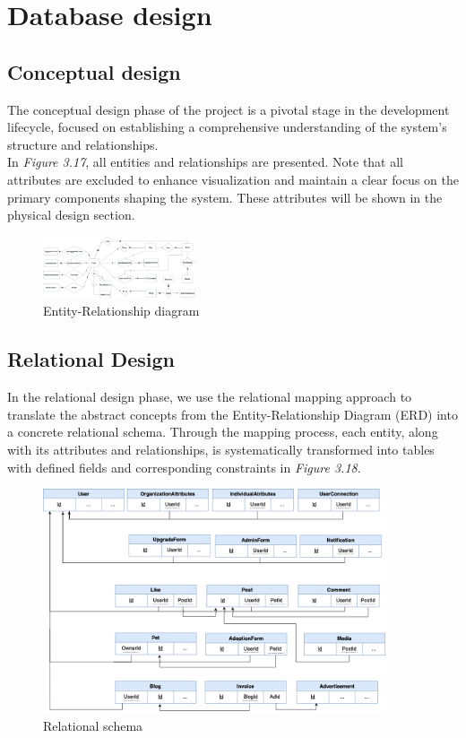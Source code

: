 \newpage
\section{Database design}

\subsection{Conceptual design}

The conceptual design phase of the project is a pivotal stage in the development lifecycle, focused on establishing a comprehensive understanding of the system's structure and relationships.
\\
In \textit{Figure 3.17}, all entities and relationships are presented. Note that all attributes are excluded to enhance visualization and maintain a clear focus on the primary components shaping the system. These attributes will be shown in the physical design section.

\begin{figure}[H]
    \centering
    \includegraphics[angle=-90,width=0.4\textwidth]{Figures/DatabaseDesign/Entities-ERD.png}
    \caption{Entity-Relationship diagram}
\end{figure}
\clearpage

\subsection{Relational Design}

In the relational design phase, we use the relational mapping approach
to translate the abstract concepts from the Entity-Relationship Diagram
(ERD) into a concrete relational schema. Through the mapping process,
each entity, along with its attributes and relationships, is
systematically transformed into tables with defined fields and
corresponding constraints in \emph{Figure 3.18}.

\begin {figure}[H]
\centering
\includegraphics[width=0.9\textwidth]{Figures/DatabaseDesign/Entities-Mapping.png}
\caption{Relational schema}
\end{figure}

